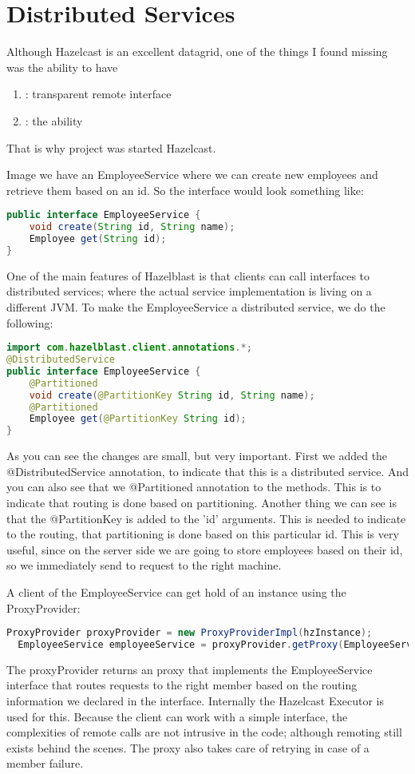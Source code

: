\chapter{Distributed Services}
Although Hazelcast is an excellent datagrid, one of the things I found missing was the ability to have 
\begin{enumerate}
\item: transparent remote interface
\item: the ability 
\end{enumerate}

That is why project was started Hazelcast.

Image we have an EmployeeService where we can create new employees and retrieve them based on an id. So the interface would look something like:
\begin{lstlisting}[language=java]
public interface EmployeeService {
    void create(String id, String name);
    Employee get(String id);
}
\end{lstlisting}
One of the main features of Hazelblast is that clients can call interfaces to distributed services; where the actual service implementation is living on a different JVM. To make the EmployeeService a distributed service, we do the following: 
\begin{lstlisting}[language=java]
import com.hazelblast.client.annotations.*;
@DistributedService
public interface EmployeeService {
    @Partitioned
    void create(@PartitionKey String id, String name);
    @Partitioned
    Employee get(@PartitionKey String id);
}
\end{lstlisting}
As you can see the changes are small, but very important. First we added the @DistributedService annotation, to indicate that this is a distributed service. And you can also see that we @Partitioned annotation to the methods. This is to indicate that routing is done based on partitioning. Another thing we can see is that the @PartitionKey is added to the 'id' arguments. This is needed to indicate to the routing, that partitioning is done based on this particular id. This is very useful, since on the server side we are going to store employees based on their id, so we immediately send to request to the right machine. 

A client of the EmployeeService can get hold of an instance using the ProxyProvider:
\begin{lstlisting}[language=java]
  ProxyProvider proxyProvider = new ProxyProviderImpl(hzInstance);
  EmployeeService employeeService = proxyProvider.getProxy(EmployeeService.class);
\end{lstlisting}
The proxyProvider returns an proxy that implements the EmployeeService interface that routes requests to the right member based on the routing information we declared in the interface. Internally the Hazelcast Executor is used for this. Because the client can work with a simple interface, the complexities of remote calls are not intrusive in the code; although remoting still exists behind the scenes. The proxy also takes care of retrying in case of a member failure. 

